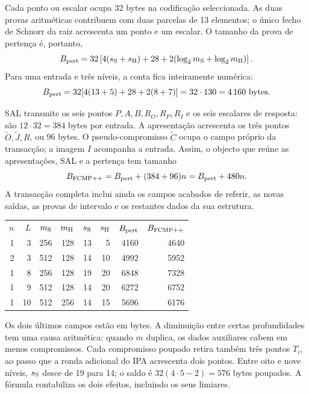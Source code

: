 Cada ponto ou escalar ocupa 32 bytes na codificação
seleccionada. As duas provas aritméticas contribuem com
duas parcelas de 13 elementos; o único fecho de Schnorr
da raiz acrescenta um ponto e um escalar. O tamanho da
prova de pertença é, portanto,
\begin{equation}
 B_{\rm pert}=32\left[
  4(s_{\rm S}+s_{\rm H})+28
  +2(\log_2m_{\rm S}+\log_2m_{\rm H})\right].
 \label{eq:fcmp-membership-size}
\end{equation}
Para uma entrada e três níveis, a conta fica inteiramente
numérica:
\[
 B_{\rm pert}
 =32[4(13+5)+28+2(8+7)]
 =32\cdot130=4\,160\ \hbox{bytes}.
\]

SAL transmite os seis pontos
\(P,A,B,R_O,R_P,R_I\) e os seis escalares de resposta:
são \(12\cdot32=384\) bytes por entrada. A apresentação
acrescenta os três pontos
\(\widetilde O,\widetilde J,R\), ou 96 bytes.
O pseudo-compromisso \(\widetilde C\) ocupa o campo
próprio da transacção; a imagem \(I\) acompanha a entrada.
Assim, o objecto que reúne as apresentações, SAL e a
pertença tem tamanho
\begin{equation}
 B_{\rm FCMP++}=B_{\rm pert}+(384+96)n
              =B_{\rm pert}+480n.
 \label{eq:fcmp-proof-byte-size}
\end{equation}
A transacção completa inclui ainda os campos acabados de
referir, as novas saídas, as provas de intervalo e os
restantes dados da sua estrutura.

\begin{center}
\small
\begin{tabular}{rrrrrrrr}
\(n\)&\(L\)&\(m_{\rm S}\)&\(m_{\rm H}\)&
\(s_{\rm S}\)&\(s_{\rm H}\)&
\(B_{\rm pert}\)&\(B_{\rm FCMP++}\)\\[1mm]
1&3&256&128&13&5&4160&4640\\
2&3&512&128&14&10&4992&5952\\
1&8&256&128&19&20&6848&7328\\
1&9&512&128&14&20&6272&6752\\
1&10&512&256&14&15&5696&6176
\end{tabular}
\end{center}
Os dois últimos campos estão em bytes. A diminuição
entre certas profundidades tem uma causa aritmética:
quando \(m\) duplica, os dados auxiliares cabem em menos
compromissos. Cada compromisso poupado retira também
três pontos \(T_i\), ao passo que a ronda adicional
do IPA acrescenta dois pontos. Entre oito e nove níveis,
\(s_{\rm S}\) desce de 19 para 14; o saldo é
\(32(4\cdot5-2)=576\) bytes poupados. A fórmula
contabiliza os dois efeitos, incluindo os seus limiares.

